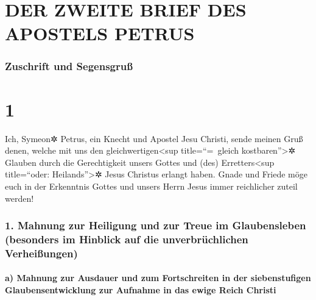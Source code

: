 \hypertarget{der-zweite-brief-des-apostels-petrus}{%
\section{DER ZWEITE BRIEF DES APOSTELS
PETRUS}\label{der-zweite-brief-des-apostels-petrus}}

\hypertarget{zuschrift-und-segensgruuxdf}{%
\subsubsection{Zuschrift und
Segensgruß}\label{zuschrift-und-segensgruuxdf}}

\hypertarget{section}{%
\section{1}\label{section}}

 Ich, Symeon✲ Petrus, ein Knecht und Apostel Jesu Christi,
sende meinen Gruß denen, welche mit uns den gleichwertigen\textless sup
title=``=~gleich kostbaren''\textgreater✲ Glauben durch die
Gerechtigkeit unsers Gottes und (des) Erretters\textless sup
title=``oder: Heilands''\textgreater✲ Jesus Christus erlangt haben.
 Gnade und Friede möge euch in der Erkenntnis Gottes und
unsers Herrn Jesus immer reichlicher zuteil werden!

\hypertarget{mahnung-zur-heiligung-und-zur-treue-im-glaubensleben-besonders-im-hinblick-auf-die-unverbruxfcchlichen-verheiuxdfungen}{%
\subsubsection{1. Mahnung zur Heiligung und zur Treue im Glaubensleben
(besonders im Hinblick auf die unverbrüchlichen
Verheißungen)}\label{mahnung-zur-heiligung-und-zur-treue-im-glaubensleben-besonders-im-hinblick-auf-die-unverbruxfcchlichen-verheiuxdfungen}}

\hypertarget{a-mahnung-zur-ausdauer-und-zum-fortschreiten-in-der-siebenstufigen-glaubensentwicklung-zur-aufnahme-in-das-ewige-reich-christi}{%
\paragraph{a) Mahnung zur Ausdauer und zum Fortschreiten in der
siebenstufigen Glaubensentwicklung zur Aufnahme in das ewige Reich
Christi}\label{a-mahnung-zur-ausdauer-und-zum-fortschreiten-in-der-siebenstufigen-glaubensentwicklung-zur-aufnahme-in-das-ewige-reich-christi}}

